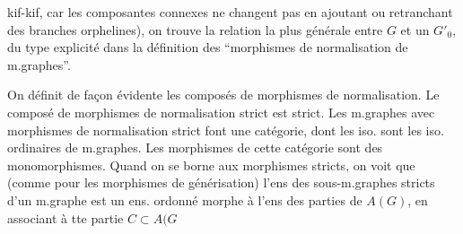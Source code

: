 kif-kif, car les composantes connexes ne changent pas en ajoutant ou retranchant des branches orphelines), on trouve la relation la plus générale entre $G$ et un $G'_0$, du type explicité dans la définition des ``morphismes de normalisation de m.graphes''.

On définit de façon évidente les composés de morphismes de normalisation. Le composé de morphismes de normalisation strict est strict. Les m.graphes avec morphismes de normalisation strict font une catégorie, dont les iso. sont les iso. ordinaires de m.graphes. Les morphismes de cette catégorie sont des monomorphismes. Quand on se borne aux morphismes  stricts, on voit que (comme pour les morphismes de générisation) l'ens des sous-m.graphes stricts d'un m.graphe  est un ens. ordonné morphe à l'ens des parties de $A(G)$, en associant à tte partie $C\subset A(G$
